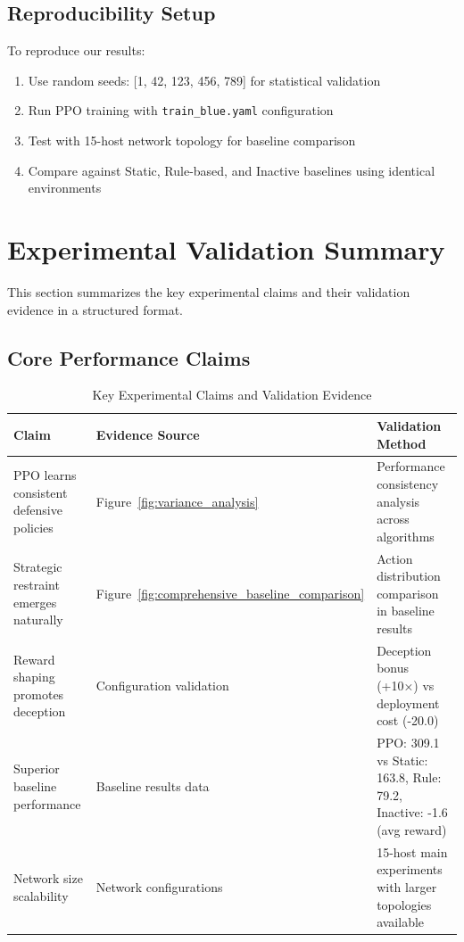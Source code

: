 \documentclass[12pt,oneside]{article}
\begin{document}
\subsection{Reproducibility Setup}
To reproduce our results:
\begin{enumerate}
    \item Use random seeds: [1, 42, 123, 456, 789] for statistical validation
    \item Run PPO training with \texttt{train\_blue.yaml} configuration 
    \item Test with 15-host network topology for baseline comparison
    \item Compare against Static, Rule-based, and Inactive baselines using identical environments
\end{enumerate}

\section{Experimental Validation Summary}

This section summarizes the key experimental claims and their validation evidence in a structured format.

\subsection{Core Performance Claims}

\begin{table}[H]
\centering
\caption{Key Experimental Claims and Validation Evidence}
\label{tab:validation_claims}
\small
\begin{tabular}{|p{4cm}|p{4cm}|p{4cm}|}
\hline
\rowcolor{cwBorder!30} \textbf{Claim} & \textbf{Evidence Source} & \textbf{Validation Method} \\
\hline
PPO learns consistent defensive policies & Figure~\ref{fig:variance_analysis} & Performance consistency analysis across algorithms \\
\hline
Strategic restraint emerges naturally & Figure~\ref{fig:comprehensive_baseline_comparison} & Action distribution comparison in baseline results \\
\hline
Reward shaping promotes deception & Configuration validation & Deception bonus (+10×) vs deployment cost (-20.0) \\
\hline
Superior baseline performance & Baseline results data & PPO: 309.1 vs Static: 163.8, Rule: 79.2, Inactive: -1.6 (avg reward) \\
\hline
Network size scalability & Network configurations & 15-host main experiments with larger topologies available \\
\hline
\end{tabular}
\end{table}
\end{document}
